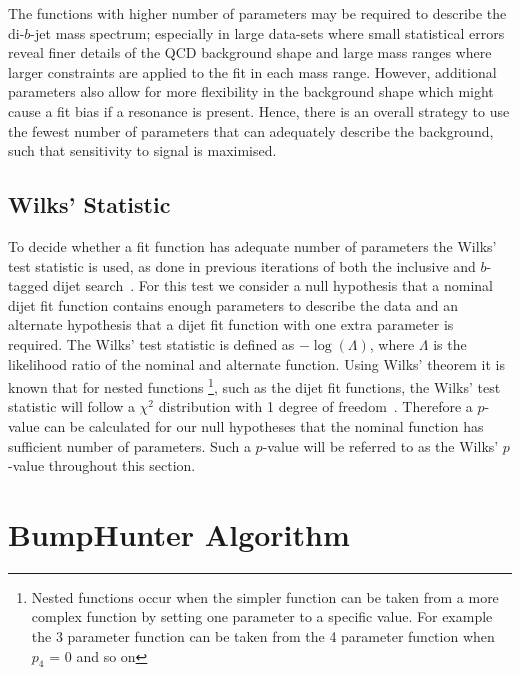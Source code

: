 The functions with higher number of parameters may be required to describe the di-$b$-jet mass spectrum;
especially in large data-sets where small statistical errors reveal finer details of the QCD background shape
and large mass ranges where larger constraints are applied to the fit in each mass range.
However, additional parameters also allow for more flexibility in the background shape
which might cause a fit bias if a resonance is present.
Hence, there is an overall strategy to use the fewest number of parameters
that can adequately describe the background, such that sensitivity to signal is maximised.

\subsection{Wilks' Statistic}
\label{sec:bkg-bkg_wilks}

To decide whether a fit function has adequate number of parameters the Wilks' test statistic is used,
as done in previous iterations of both the inclusive and $b$-tagged dijet search~\cite{dijet-mori16_paper,dibjet-mori16_paper}.
For this test we consider a null hypothesis that a nominal dijet fit function contains enough parameters to describe the data
and an alternate hypothesis that a dijet fit function with one extra parameter is required.
The Wilks' test statistic is defined as $-\log{(\Lambda)}$, where $\Lambda$ is the likelihood ratio of the nominal and alternate function.
Using Wilks' theorem it is known that for nested functions
\footnote{Nested functions occur when the simpler function can be taken from a more complex function by setting one parameter to a specific value.
  For example the 3 parameter function can be taken from the 4 parameter function when $p_4$ = 0 and so on},
such as the dijet fit functions,
the Wilks' test statistic will follow a $\chi^2$ distribution with 1 degree of freedom~\cite{dibjet-wilks}.
Therefore a \mbox{$p$-value} can be calculated for our null hypotheses that the nominal function has sufficient number of parameters.
Such a \mbox{$p$-value} will be referred to as the Wilks' \mbox{$p$-value} throughout this section.


\section{BumpHunter Algorithm}
\label{sec:bkg-bh}

